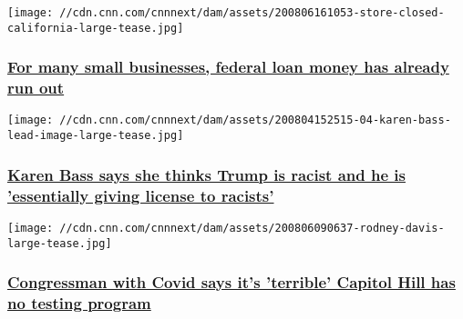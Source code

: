\href{/2020/08/06/politics/ppp-small-business-loan-congress-second-round/index.html}{}

\texttt{[image: //cdn.cnn.com/cnnnext/dam/assets/200806161053-store-closed-california-large-tease.jpg]}

\hypertarget{for-many-small-businesses-federal-loan-money-has-already-run-out}{%
\subsubsection{\texorpdfstring{\href{/2020/08/06/politics/ppp-small-business-loan-congress-second-round/index.html}{For
many small businesses, federal loan money has already run
out}}{For many small businesses, federal loan money has already run out}}\label{for-many-small-businesses-federal-loan-money-has-already-run-out}}

\href{/2020/08/06/politics/karen-bass-says-trump-racist/index.html}{}

\texttt{[image: //cdn.cnn.com/cnnnext/dam/assets/200804152515-04-karen-bass-lead-image-large-tease.jpg]}

\hypertarget{karen-bass-says-she-thinks-trump-is-racist-and-he-is-essentially-giving-license-to-racists}{%
\subsubsection{\texorpdfstring{\href{/2020/08/06/politics/karen-bass-says-trump-racist/index.html}{Karen
Bass says she thinks Trump is racist and he is 'essentially giving
license to
racists'}}{Karen Bass says she thinks Trump is racist and he is 'essentially giving license to racists'}}\label{karen-bass-says-she-thinks-trump-is-racist-and-he-is-essentially-giving-license-to-racists}}

\href{/2020/08/06/politics/rodney-davis-capitol-hill-testing-program-cnntv/index.html}{}

\texttt{[image: //cdn.cnn.com/cnnnext/dam/assets/200806090637-rodney-davis-large-tease.jpg]}

\hypertarget{congressman-with-covid-says-its-terrible-capitol-hill-has-no-testing-program}{%
\subsubsection{\texorpdfstring{\href{/2020/08/06/politics/rodney-davis-capitol-hill-testing-program-cnntv/index.html}{Congressman
with Covid says it's 'terrible' Capitol Hill has no testing
program}}{Congressman with Covid says it's 'terrible' Capitol Hill has no testing program}}\label{congressman-with-covid-says-its-terrible-capitol-hill-has-no-testing-program}}


